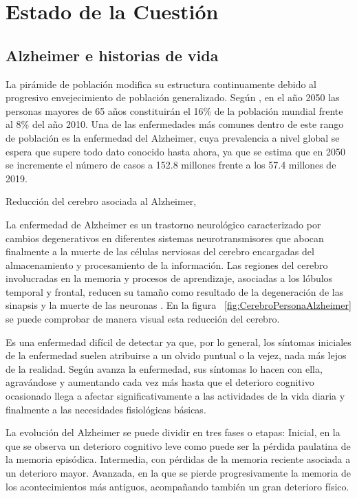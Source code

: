 \chapter{Estado de la Cuestión}
\label{cap:estadoDeLaCuestion}


\section{Alzheimer e historias de vida}
La pirámide de población modifica su estructura continuamente debido al progresivo envejecimiento de población generalizado. Según \cite{estalz}, en el año 2050 las personas mayores de 65 años constituirán el 16\% de la población mundial frente al 8\%  del año 2010. Una de las enfermedades más comunes dentro de este rango de población es la enfermedad del Alzheimer, cuya prevalencia a nivel global se espera que supere todo dato conocido hasta ahora, ya que se estima que en 2050 se incremente el número de casos a 152.8 millones frente a los 57.4 millones de 2019. 

%
{Reducción del cerebro asociada al Alzheimer, \citet{mattson2004pathways}}

La enfermedad de Alzheimer es un trastorno neurológico caracterizado por cambios degenerativos en diferentes sistemas neurotransmisores que abocan finalmente a la muerte de las células nerviosas del cerebro encargadas del almacenamiento y procesamiento de la información. Las regiones del cerebro involucradas en la memoria y procesos de aprendizaje, asociadas a los lóbulos temporal y frontal, reducen su tamaño como resultado de la degeneración de las sinapsis y la muerte de las neuronas \citep{romano2007enfermedad,mattson2004pathways}. En la figura ~\ref{fig:CerebroPersonaAlzheimer} se puede comprobar de manera visual esta reducción del cerebro.

Es una enfermedad difícil de detectar ya que, por lo general, los síntomas iniciales de la enfermedad suelen atribuirse a un olvido puntual o la vejez, nada más lejos de la realidad. Según avanza la enfermedad, sus síntomas lo hacen con ella, agravándose y aumentando cada vez más hasta que el deterioro cognitivo ocasionado llega a afectar significativamente a las actividades de la vida diaria y finalmente a las necesidades fisiológicas básicas.

La evolución del Alzheimer se puede dividir en tres fases o etapas: Inicial, en la que se observa un deterioro cognitivo leve como puede ser la pérdida paulatina de la memoria episódica. Intermedia, con pérdidas de la memoria reciente asociada a un deterioro mayor. Avanzada, en la que se pierde progresivamente la memoria de los acontecimientos más antiguos, acompañando también un gran deterioro físico.

